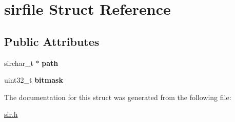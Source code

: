 \hypertarget{structsirfile}{}\section{sirfile Struct Reference}
\label{structsirfile}
\subsection*{Public Attributes}
\begin{DoxyCompactItemize}
\item 
sirchar\+\_\+t $\ast$ {\bfseries path}\hypertarget{structsirfile_a9f4b5f85f13a12175ebcced6820f4257}{}\label{structsirfile_a9f4b5f85f13a12175ebcced6820f4257}

\item 
uint32\+\_\+t {\bfseries bitmask}\hypertarget{structsirfile_a790ddd06714811723362943081a7d730}{}\label{structsirfile_a790ddd06714811723362943081a7d730}

\end{DoxyCompactItemize}


The documentation for this struct was generated from the following file\+:\begin{DoxyCompactItemize}
\item 
\hyperlink{sir_8h}{sir.\+h}\end{DoxyCompactItemize}
